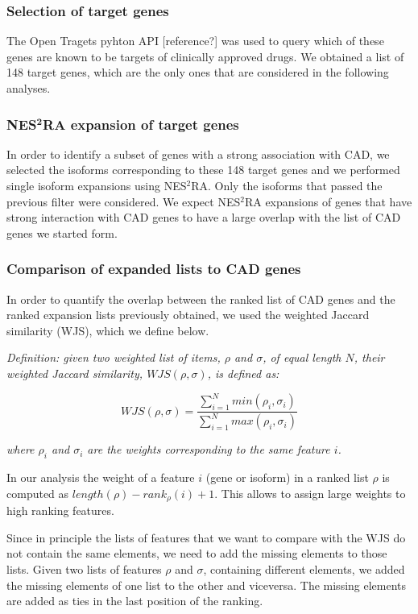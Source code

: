 \documentclass[fleqn,10pt]{SelfArx} %
\begin{document}
\subsubsection{Selection of target genes}

The Open Tragets pyhton API [reference?] was used to query which of these genes are known to be targets of clinically approved drugs. We obtained a list of 148 target genes, which are the only ones that are considered in the following analyses.

\subsubsection{NES$^{\textbf{2}}$RA expansion of target genes}

In order to identify a subset of genes with a strong association with CAD, we selected the isoforms corresponding to these 148 target genes and we performed single isoform expansions using NES$^2$RA. Only the isoforms that passed the previous filter were considered. We expect NES$^2$RA expansions of genes that have strong interaction with CAD genes to have a large overlap with the list of CAD genes we started form.

\subsubsection{Comparison of expanded lists to CAD genes}

In order to quantify the overlap between the ranked list of CAD genes and the ranked expansion lists previously obtained, we used the weighted Jaccard similarity (WJS), which we define below.\medskip

\noindent
\textit{Definition: given two weighted list of items, $\rho$ and $\sigma$, of equal length $N$, their weighted Jaccard similarity, $WJS(\rho, \sigma)$, is defined as:}

$$
WJS(\rho, \sigma) = \dfrac{\sum_{i=1}^Nmin(\rho_i,\sigma_i)}{\sum_{i=1}^Nmax(\rho_i,\sigma_i)}
$$

\noindent
\textit{where $\rho_i$ and $\sigma_i$ are the weights corresponding to the same feature $i$.}\medskip

In our analysis the weight of a feature $i$ (gene or isoform) in a ranked list $\rho$ is computed as $length(\rho) - rank_{\rho}(i) + 1$. This allows to assign large weights to high ranking features.

Since in principle the lists of features that we want to compare with the WJS do not contain the same elements, we need to add the missing elements to those lists. Given two lists of features $\rho$ and $\sigma$, containing different elements, we added the missing elements of one list to the other and viceversa. The missing elements are added as ties in the last position of the ranking.
\end{document}
